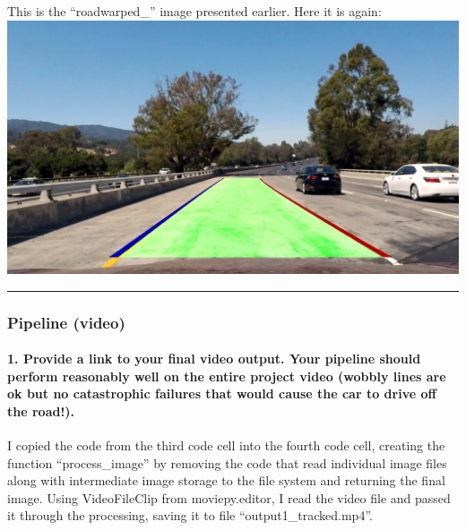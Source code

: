 \documentclass[11pt]{article}
\makeatletter
\def\maxwidth{\ifdim\Gin@nat@width>\linewidth\linewidth
    \else\Gin@nat@width\fi}
\let\Oldincludegraphics\includegraphics
\renewcommand{\includegraphics}[1]{\Oldincludegraphics[width=.8\maxwidth]{#1}}
\makeatother
\begin{document}
This is the ``roadwarped\_'' image presented earlier. Here it is again:
\includegraphics{./output_images/roadwarped_test1.jpg}

\begin{center}\rule{0.5\linewidth}{\linethickness}\end{center}

\hypertarget{pipeline-video}{%
\subsubsection{Pipeline (video)}\label{pipeline-video}}

\hypertarget{provide-a-link-to-your-final-video-output.-your-pipeline-should-perform-reasonably-well-on-the-entire-project-video-wobbly-lines-are-ok-but-no-catastrophic-failures-that-would-cause-the-car-to-drive-off-the-road.}{%
\paragraph{1. Provide a link to your final video output. Your pipeline
should perform reasonably well on the entire project video (wobbly lines
are ok but no catastrophic failures that would cause the car to drive
off the
road!).}\label{provide-a-link-to-your-final-video-output.-your-pipeline-should-perform-reasonably-well-on-the-entire-project-video-wobbly-lines-are-ok-but-no-catastrophic-failures-that-would-cause-the-car-to-drive-off-the-road.}}

I copied the code from the third code cell into the fourth code cell,
creating the function ``process\_image'' by removing the code that read
individual image files along with intermediate image storage to the file
system and returning the final image. Using VideoFileClip from
moviepy.editor, I read the video file and passed it through the
processing, saving it to file ``output1\_tracked.mp4''.
\end{document}

